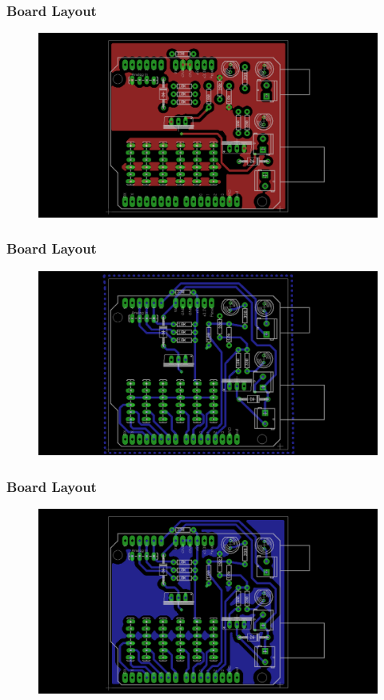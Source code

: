 \documentclass{beamer}
\begin{document}

\begin{frame}
\frametitle{Board Layout}
\begin{figure}
\includegraphics[width=1\linewidth]{boardfilltop.png}
\end{figure}
\end{frame}


\begin{frame}
\frametitle{Board Layout}
\begin{figure}
\includegraphics[width=1\linewidth]{boardbot.png}
\end{figure}
\end{frame}


\begin{frame}
\frametitle{Board Layout}
\begin{figure}
\includegraphics[width=1\linewidth]{boardfillbot.png}
\end{figure}
\end{frame}
\end{document}
